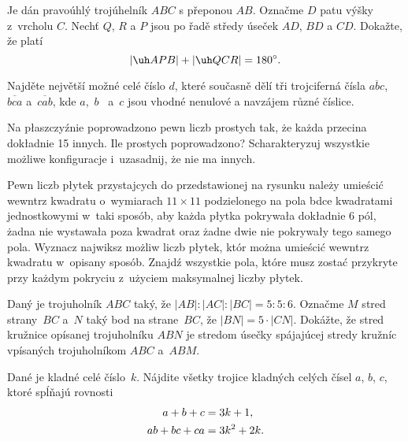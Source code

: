 {%
Je dán pravoúhlý trojúhelník $ABC$ s přeponou $AB$. Označme $D$ patu výšky z~vrcholu $C$. Nechť $Q$, $R$ a $P$ jsou po řadě středy úseček $AD$, $BD$ a $CD$. Dokažte, že platí
$$
|\uh APB|+|\uh QCR|=180^{\circ}.
$$
}

{%
Najděte největší možné celé číslo $d$, které současně dělí tři trojciferná čísla $\overline{abc}$, $\overline{bca}$ a~$\overline{cab}$, kde $a$,~$b$~ a~$c$ jsou vhodné nenulové a navzájem různé číslice.
}

{%
Na p\l{}aszczyźnie poprowadzono pewn\ą{} liczb\ę{} prostych tak, że każda przecina dok\l{}adnie 15 innych. Ile prostych poprowadzono? Scharakteryzuj wszystkie możliwe konfiguracje i~uzasadnij, że nie ma innych.
}

{%
Pewn\ą{} liczb\ę{} p\l{}ytek przystaj\ą{}cych do przedstawionej na rysunku należy umieścić wewn\ą{}trz kwadratu o~wymiarach $11\times 11$ podzielonego na pola b\ę{}d\ą{}ce kwadratami jednostkowymi w~taki sposób, aby każda p\l{}ytka pokrywa\l{}a dok\l{}adnie $6$ pól, żadna nie wystawa\l{}a poza kwadrat oraz żadne dwie nie pokrywa\l{}y tego samego pola.
 Wyznacz najwi\ę{}ksz\ą{} możliw\ą{} liczb\ę{} p\l{}ytek, któr\ą{} można umieścić wewn\ą{}trz kwadratu w~opisany sposób.
 Znajdź wszystkie pola, które musz\ą{} zostać przykryte przy każdym pokryciu z~użyciem maksymalnej liczby p\l{}ytek.\endgraf
%
}

{%
Daný je trojuholník $ABC$ taký, že $|AB|:|AC|:|BC| = 5:5:6$. Označme $M$ stred strany~$BC$ a~$N$ taký bod na strane~$BC$, že $|BN| = 5\cdot|CN|$. Dokážte, že stred kružnice opísanej trojuholníku $ABN$ je stredom úsečky spájajúcej stredy kružníc vpísaných trojuholníkom $ABC$ a~$ABM$.
}

{%
Dané je kladné celé číslo~$k$. Nájdite všetky trojice kladných celých čísel $a$, $b$, $c$, ktoré spĺňajú rovnosti
$$
\aligned
a+b+c&=3k+1,\\
ab+bc+ca&=3k^2+2k.
\endaligned
$$
}
